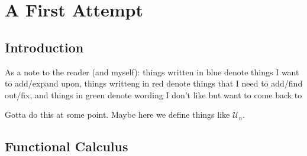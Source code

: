 \chapter{A First Attempt}\label{ch:FirstAttempt}


\section{Introduction}%
\label{sec:Intro}

As a note to the reader (and myself): things written in {\color{blue} blue}
denote things I want to add/expand upon, things writteng in {\color{red} red}
denote things that I need to add/find out/fix, and things in {\color{green} green}
denote wording I don't like but want to come back to

{\color{blue} Gotta do this at some point. Maybe here we define things like \(\mathcal{U}_n\).}

\section{Functional Calculus}%
\label{sec:functionalcalc}

